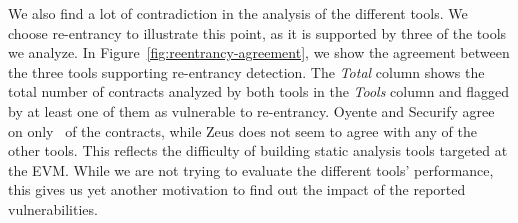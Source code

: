 We also find a lot of contradiction in the analysis of the different tools.
We choose re-entrancy to illustrate this point, as it is supported by three of the tools we analyze. In Figure~\ref{fig:reentrancy-agreement}, we show the agreement between the three tools supporting re-entrancy detection. The \emph{Total} column shows the total number of contracts analyzed by both tools in the \emph{Tools} column and flagged by at least one of them as vulnerable to re-entrancy. Oyente and Securify agree on only~ of the contracts, while Zeus does not seem to agree with any of the other tools.
This reflects the difficulty of building static analysis tools targeted at the EVM. While we are not trying to evaluate the different tools' performance, this gives us yet another motivation to find out the impact of the reported vulnerabilities.
